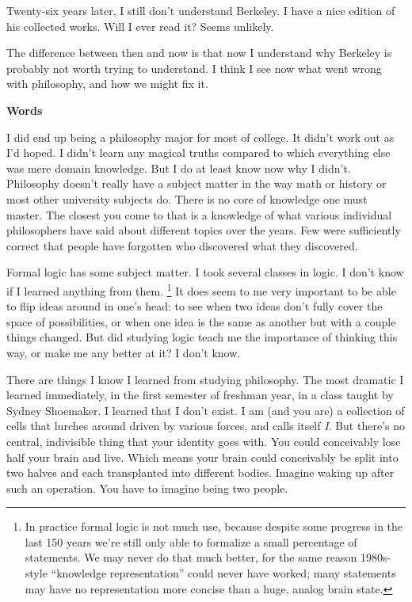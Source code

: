\documentclass[12pt]{book}
\begin{document}
Twenty-six years later, I still don't understand Berkeley. I have a nice
edition of his collected works. Will I ever read it? Seems unlikely.

The difference between then and now is that now I understand why
Berkeley is probably not worth trying to understand. I think I see now
what went wrong with philosophy, and how we might fix it.

\textbf{Words}

I did end up being a philosophy major for most of college. It didn't
work out as I'd hoped. I didn't learn any magical truths compared to
which everything else was mere domain knowledge. But I do at least know
now why I didn't. Philosophy doesn't really have a subject matter in the
way math or history or most other university subjects do. There is no
core of knowledge one must master. The closest you come to that is a
knowledge of what various individual philosophers have said about
different topics over the years. Few were sufficiently correct that
people have forgotten who discovered what they discovered.

Formal logic has some subject matter. I took several classes in logic. I
don't know if I learned anything from them. \footnote{In practice formal logic is not much use, because despite some
progress in the last 150 years we're still only able to formalize a
small percentage of statements. We may never do that much better, for
the same reason 1980s-style ``knowledge representation'' could never
have worked; many statements may have no representation more concise
than a huge, analog brain state.} It
does seem to me very important to be able to flip ideas around in one's
head: to see when two ideas don't fully cover the space of
possibilities, or when one idea is the same as another but with a couple
things changed. But did studying logic teach me the importance of
thinking this way, or make me any better at it? I don't know.

There are things I know I learned from studying philosophy. The most
dramatic I learned immediately, in the first semester of freshman year,
in a class taught by Sydney Shoemaker. I learned that I don't exist. I
am (and you are) a collection of cells that lurches around driven by
various forces, and calls itself \emph{I}. But there's no central,
indivisible thing that your identity goes with. You could conceivably
lose half your brain and live. Which means your brain could conceivably
be split into two halves and each transplanted into different bodies.
Imagine waking up after such an operation. You have to imagine being two
people.
\end{document}
